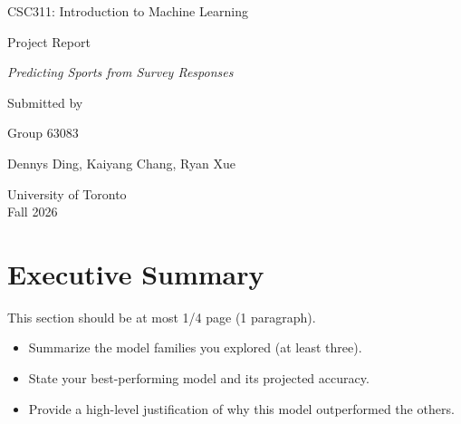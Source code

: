 \documentclass[12pt]{article}
\begin{document}
\begin{titlepage}
    \centering
    \vspace*{3cm}

    {\Large {CSC311: Introduction to Machine Learning} \par}
    \vspace{1cm}

    {\Large {Project Report} \par}
    \vspace{1cm}

    {\large \textit{Predicting Sports from Survey Responses} \par}
    \vspace{3cm}

    {\large Submitted by \par}

    \vspace{0.5cm}
    {\large Group 63083 \par}

    \vspace{0.5cm}
    {\large Dennys Ding, Kaiyang Chang, Ryan Xue \par}

    \vfill
    {\large University of Toronto \\ Fall 2026 \par}
\end{titlepage}
\clearpage
\setcounter{page}{1}

\section{Executive Summary}

This section should be at most 1/4 page (1 paragraph).

\begin{itemize}
  \item Summarize the model families you explored (at least three).
  \item State your best-performing model and its projected accuracy.
  \item Provide a high-level justification of why this model outperformed the others.
\end{itemize}
\end{document}
